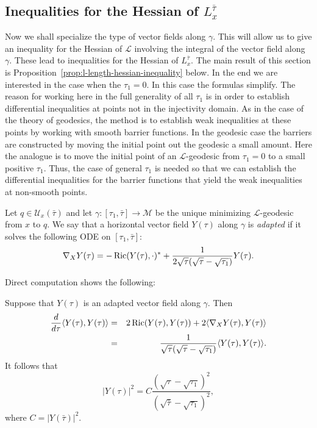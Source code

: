 \subsection{Inequalities for the Hessian of $L_x^{\bar\tau}$}

Now we shall specialize the type of vector fields along $\gamma$.
This will allow us to give an inequality for the Hessian of
${\mathcal L}$ involving the integral of the vector field along
$\gamma$. These lead to inequalities for the Hessian of
$L_x^{\bar\tau}$. The main result
of this section is Proposition~\ref{prop:l-length-hessian-inequality} below. In the end we
are interested in the case when the $\tau_1=0$. In this case the
formulas simplify. The reason for working here in the full
generality of all $\tau_1$ is in order to establish differential
inequalities at points not in the injectivity domain. As in the case
of the theory of geodesics, the method is to establish weak
inequalities at these points by working with smooth barrier
functions. In the geodesic case the barriers are constructed by
moving the initial point out the geodesic a small amount. Here the
analogue is to move the initial point of an ${\mathcal L}$-geodesic
from $\tau_1=0$ to a small positive $\tau_1$. Thus, the case of
general $\tau_1$ is needed so that we can establish the differential
inequalities for the barrier functions that yield the weak
inequalities at non-smooth points.

\begin{definition}\label{def:adapted-vector-field}

Let $q\in {\mathcal U}_x(\bar\tau)$ and let $\gamma\colon
[\tau_1,\bar\tau]\to {\mathcal M}$ be the unique minimizing
${\mathcal L}$-geodesic from $x$ to $q$. We say that a horizontal
vector field $Y(\tau)$ along $\gamma$ is {\em adapted} if it solves
the following ODE on $[\tau_1,\bar \tau]$:
\begin{equation}\label{firstYeqn}
\nabla_{X}Y(\tau) = -\operatorname{Ric}(Y(\tau),\cdot)^* +
\frac{1}{2\sqrt{\tau}(\sqrt{\tau}-\sqrt{\tau_1})}Y(\tau).
\end{equation}
 \end{definition}

Direct computation shows the following:

 \begin{lemma}\label{lem:adapted-vector-field-norm}
\label{adaptform}
 Suppose that $Y(\tau)$ is an adapted vector field along $\gamma$.
 Then
\begin{eqnarray}\label{secondYeqn}
\frac{d}{d\tau}\langle Y(\tau),Y(\tau)\rangle & = &
2\operatorname{Ric}(Y(\tau),Y(\tau)) + 2\langle \nabla_{X}Y(\tau),Y(\tau)\rangle \\
& = &  \frac{1}{\sqrt{\tau}(\sqrt{\tau}-\sqrt{\tau_1})}\langle
Y(\tau),Y(\tau)\rangle\nonumber.
\end{eqnarray} It follows that
$$|Y(\tau)|^2 = C\frac{(\sqrt{\tau}-\sqrt{\tau_1})^2}{(\sqrt{\bar\tau}-\sqrt{\tau_1})^2},$$
where $C=|Y(\bar\tau)|^2$.
\end{lemma}





